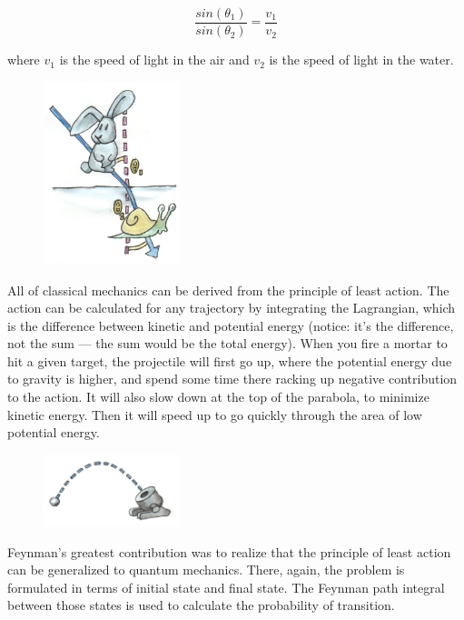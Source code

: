 \begin{equation}
\frac{sin(\theta_1)}{sin(\theta_2)} = \frac{v_1}{v_2}
\end{equation}

\noindent
where \ensuremath{v_1} is the speed of light in the air and \ensuremath{v_2} is
the speed of light in the water.

\begin{figure}[H]
\centering
\includegraphics[width=1.56250in]{images/snell.jpg}
\end{figure}

All of classical mechanics can be derived from the principle of least
action. The action can be calculated for any trajectory by integrating
the Lagrangian, which is the difference between kinetic and potential
energy (notice: it's the difference, not the sum --- the sum would be
the total energy). When you fire a mortar to hit a given target, the
projectile will first go up, where the potential energy due to gravity
is higher, and spend some time there racking up negative contribution to
the action. It will also slow down at the top of the parabola, to
minimize kinetic energy. Then it will speed up to go quickly through the
area of low potential energy.

\begin{figure}[H]
\centering
\includegraphics[width=1.56250in]{images/mortar.jpg}
\end{figure}

\noindent
Feynman's greatest contribution was to realize that the principle of
least action can be generalized to quantum mechanics. There, again, the
problem is formulated in terms of initial state and final state. The
Feynman path integral between those states is used to calculate the
probability of transition.

